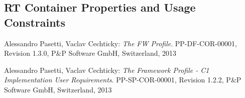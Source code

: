 \documentclass[a4paper,10pt]{article}
\begin{document}
\subsection{RT Container Properties and Usage Constraints}\label{sec:rtPropUsage}


\newpage

\begin{thebibliography}{6}
 
 Alessandro Pasetti, Vaclav Cechticky:
           {\sl The FW Profile}. PP-DF-COR-00001, Revision 1.3.0,
           P\&P Software GmbH, Switzerland, 2013 

 Alessandro Pasetti, Vaclav Cechticky:
           {\sl The Framework Profile - C1 Implementation User Requirements}. 
           PP-SP-COR-00001, Revision 1.2.2,
           P\&P Software GmbH, Switzerland, 2013 

\end{thebibliography}
\end{document}
